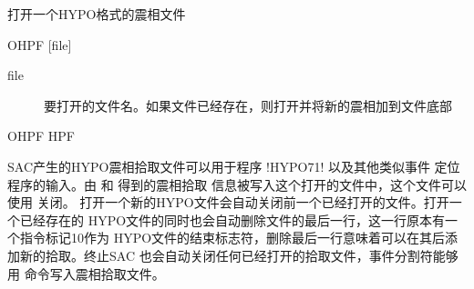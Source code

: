 \label{cmd:ohpf}

打开一个HYPO格式的震相文件

\begin{SACSTX}
OHPF [file]
\end{SACSTX}

\begin{description}
\item [file] 要打开的文件名。如果文件已经存在，则打开并将新的震相加到文件底部
\end{description}

\begin{SACDFT}
OHPF HPF
\end{SACDFT}

SAC产生的HYPO震相拾取文件可以用于程序 !HYPO71! 以及其他类似事件
定位程序的输入。由  和  得到的震相拾取
信息被写入这个打开的文件中，这个文件可以使用  关闭。
打开一个新的HYPO文件会自动关闭前一个已经打开的文件。打开一个已经存在的
HYPO文件的同时也会自动删除文件的最后一行，这一行原本有一个指令标记10作为
HYPO文件的结束标志符，删除最后一行意味着可以在其后添加新的拾取。终止SAC
也会自动关闭任何已经打开的拾取文件，事件分割符能够用 
命令写入震相拾取文件。
